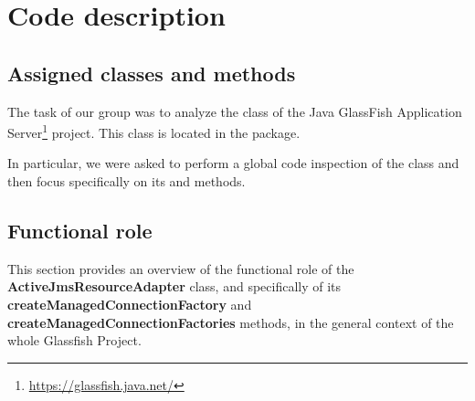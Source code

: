 \chapter{Code description}
\section{Assigned classes and methods}
The task of our group was to analyze the  class of the Java GlassFish Application Server\footnote{\url{https://glassfish.java.net/}} project. This class is located in the  package. 

In particular, we were asked to perform a global code inspection of the class and then focus specifically on its  and  methods. 
\section{Functional role}
This section provides an overview of the functional role of the \textbf{ActiveJmsResourceAdapter} class, and specifically of its \textbf{createManagedConnectionFactory} and \textbf{createManagedConnectionFactories} methods, in the general context of the whole Glassfish Project.

